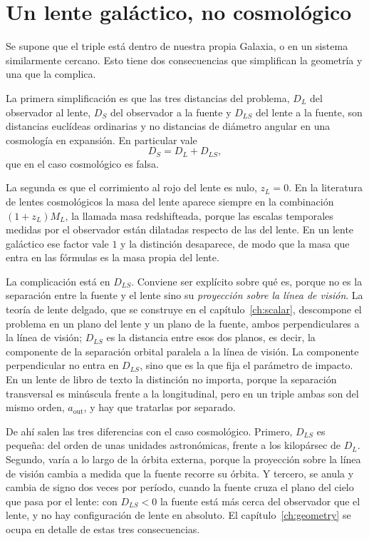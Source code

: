 \documentclass[11pt,a4paper,openany]{book}
\newcommand{\aout}{a_{\mathrm{out}}}
\begin{document}
\section{Un lente gal\'actico, no cosmol\'ogico}
\label{sec:distancias}

Se supone que el triple est\'a dentro de nuestra propia Galaxia, o en un
sistema similarmente cercano. Esto tiene dos consecuencias que simplifican la
geometr\'ia y una que la complica.

La primera simplificaci\'on es que las tres distancias del problema, $D_L$ del
observador al lente, $D_S$ del observador a la fuente y $D_{LS}$ del lente a
la fuente, son distancias eucl\'ideas ordinarias y no distancias de
di\'ametro angular en una cosmolog\'ia en expansi\'on. En particular vale
\begin{equation}
  D_S=D_L+D_{LS},
  \label{eq:euclid}
\end{equation}
que en el caso cosmol\'ogico es falsa.

La segunda es que el corrimiento al rojo del lente es nulo, $z_L=0$. En la
literatura de lentes cosmol\'ogicos la masa del lente aparece siempre en la
combinaci\'on $(1+z_L)M_L$, la llamada masa redshifteada, porque las escalas
temporales medidas por el observador est\'an dilatadas respecto de las del
lente. En un lente gal\'actico ese factor vale $1$ y la distinci\'on
desaparece, de modo que la masa que entra en las f\'ormulas es la masa propia
del lente.

La complicaci\'on est\'a en $D_{LS}$. Conviene ser expl\'icito sobre qu\'e es,
porque no es la separaci\'on entre la fuente y el lente sino su
\emph{proyecci\'on sobre la l\'inea de visi\'on}. La teor\'ia de lente
delgado, que se construye en el cap\'itulo~\ref{ch:scalar}, descompone el
problema en un plano del lente y un plano de la fuente, ambos perpendiculares
a la l\'inea de visi\'on; $D_{LS}$ es la distancia entre esos dos planos, es
decir, la componente de la separaci\'on orbital paralela a la l\'inea de
visi\'on. La componente perpendicular no entra en $D_{LS}$, sino que es la que fija el
par\'ametro de impacto. En un lente de libro de texto la distinci\'on no
importa, porque la separaci\'on transversal es min\'uscula frente a la
longitudinal, pero en un triple ambas son del mismo orden, $\aout$, y hay que
tratarlas por separado.

De ah\'i salen las tres diferencias con el caso cosmol\'ogico. Primero,
$D_{LS}$ es peque\~na: del orden de unas unidades astron\'omicas, frente a los
kilop\'arsec de $D_L$. Segundo, var\'ia a lo largo de la \'orbita externa,
porque la proyecci\'on sobre la l\'inea de visi\'on cambia a medida que la
fuente recorre su \'orbita. Y tercero, se anula y cambia de signo dos veces
por per\'iodo, cuando la fuente cruza el plano del cielo que pasa por el
lente: con $D_{LS}<0$ la fuente est\'a m\'as cerca del observador que el
lente, y no hay configuraci\'on de lente en absoluto. El
cap\'itulo~\ref{ch:geometry} se ocupa en detalle de estas tres consecuencias.
\end{document}
